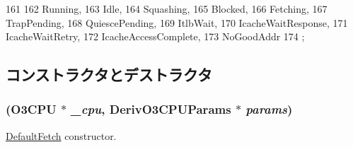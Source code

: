 \begin{DoxyCode}
161                       {
162         Running,
163         Idle,
164         Squashing,
165         Blocked,
166         Fetching,
167         TrapPending,
168         QuiescePending,
169         ItlbWait,
170         IcacheWaitResponse,
171         IcacheWaitRetry,
172         IcacheAccessComplete,
173         NoGoodAddr
174     };
\end{DoxyCode}


\subsection{コンストラクタとデストラクタ}
\hypertarget{classDefaultFetch_a96cb569fd8ae5efebb8e7716f435d9d2}{
\subsubsection[{DefaultFetch}]{ ({\bf O3CPU} $\ast$ {\em \_\-cpu}, \/  DerivO3CPUParams $\ast$ {\em params})}}
\label{classDefaultFetch_a96cb569fd8ae5efebb8e7716f435d9d2}
\hyperlink{classDefaultFetch}{DefaultFetch} constructor. 


